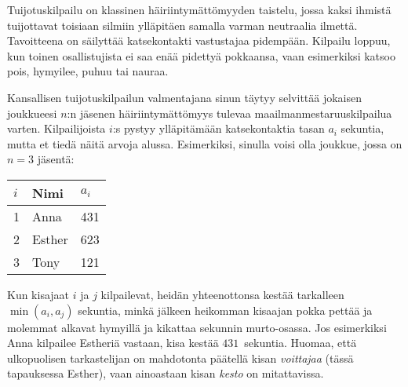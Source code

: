 

\noindent
Tuijotuskilpailu on klassinen häiriintymättömyyden taistelu, jossa kaksi ihmistä
tuijottavat toisiaan silmiin ylläpitäen samalla varman neutraalia ilmettä.
Tavoitteena on säilyttää katsekontakti vastustajaa pidempään.
Kilpailu loppuu, kun toinen osallistujista ei saa enää pidettyä pokkaansa,
vaan esimerkiksi katsoo pois, hymyilee, puhuu tai nauraa.

Kansallisen tuijotuskilpailun valmentajana sinun täytyy selvittää jokaisen 
joukkueesi $n$:n jäsenen häiriintymättömyys tulevaa maailmanmestaruuskilpailua varten.
Kilpailijoista $i$:s pystyy ylläpitämään katsekontaktia tasan $a_i$ sekuntia,
mutta et tiedä näitä arvoja alussa.
Esimerkiksi, sinulla voisi olla joukkue, jossa on $n=3$ jäsentä:

\medskip
\begin{tabular}{lll}
  $i$ & Nimi & $a_i$\\\hline
  1 & Anna &  431 \\
  2 & Esther & 623 \\
  3 & Tony &  121\\
\end{tabular}

\medskip
Kun kisajaat $i$ ja $j$ kilpailevat, heidän yhteenottonsa kestää tarkalleen 
$\min(a_i, a_j)$ sekuntia, minkä jälkeen heikomman kisaajan pokka pettää 
ja molemmat alkavat hymyillä ja kikattaa sekunnin murto-osassa.
Jos esimerkiksi Anna kilpailee Estheriä vastaan, kisa kestää $431$~sekuntia.
Huomaa, että ulkopuolisen tarkastelijan on mahdotonta päätellä 
kisan \emph{voittajaa} (tässä tapauksessa Esther), vaan ainoastaan kisan 
\emph{kesto} on mitattavissa.


